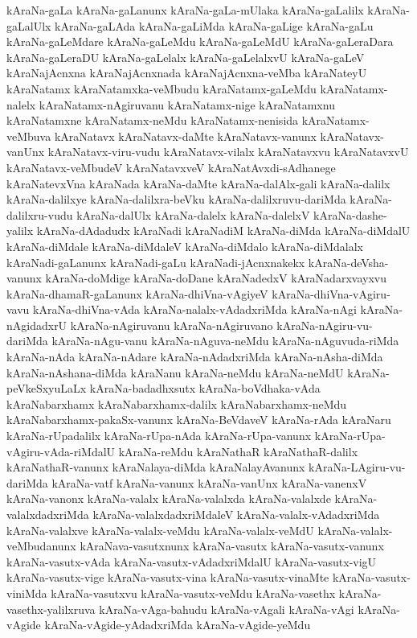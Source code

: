 {kAraNa-gaLa
kAraNa-gaLanunx
kAraNa-gaLa-mUlaka
kAraNa-gaLalilx
kAraNa-gaLalUlx
kAraNa-gaLAda
kAraNa-gaLiMda
kAraNa-gaLige
kAraNa-gaLu
kAraNa-gaLeMdare
kAraNa-gaLeMdu
kAraNa-gaLeMdU
kAraNa-gaLeraDara
kAraNa-gaLeraDU
kAraNa-gaLelalx
kAraNa-gaLelalxvU
kAraNa-gaLeV
kAraNajAcnxna
kAraNajAcnxnada
kAraNajAcnxna-veMba
kAraNateyU
kAraNatamx
kAraNatamxka-veMbudu
kAraNatamx-gaLeMdu
kAraNatamx-nalelx
kAraNatamx-nAgiruvanu
kAraNatamx-nige
kAraNatamxnu
kAraNatamxne
kAraNatamx-neMdu
kAraNatamx-nenisida
kAraNatamx-veMbuva
kAraNatavx
kAraNatavx-daMte
kAraNatavx-vanunx
kAraNatavx-vanUnx
kAraNatavx-viru-vudu
kAraNatavx-vilalx
kAraNatavxvu
kAraNatavxvU
kAraNatavx-veMbudeV
kAraNatavxveV
kAraNatAvxdi-sAdhanege
kAraNatevxVna
kAraNada
kAraNa-daMte
kAraNa-dalAlx-gali
kAraNa-dalilx
kAraNa-dalilxye
kAraNa-dalilxra-beVku
kAraNa-dalilxruvu-dariMda
kAraNa-dalilxru-vudu
kAraNa-dalUlx
kAraNa-dalelx
kAraNa-dalelxV
kAraNa-dashe-yalilx
kAraNa-dAdadudx
kAraNadi
kAraNadiM
kAraNa-diMda
kAraNa-diMdalU
kAraNa-diMdale
kAraNa-diMdaleV
kAraNa-diMdalo
kAraNa-diMdalalx
kAraNadi-gaLanunx
kAraNadi-gaLu
kAraNadi-jAcnxnakekx
kAraNa-deVsha-vanunx
kAraNa-doMdige
kAraNa-doDane
kAraNadedxV
kAraNadarxvayxvu
kAraNa-dhamaR-gaLanunx
kAraNa-dhiVna-vAgiyeV
kAraNa-dhiVna-vAgiru-vavu
kAraNa-dhiVna-vAda
kAraNa-nalalx-vAdadxriMda
kAraNa-nAgi
kAraNa-nAgidadxrU
kAraNa-nAgiruvanu
kAraNa-nAgiruvano
kAraNa-nAgiru-vu-dariMda
kAraNa-nAgu-vanu
kAraNa-nAguva-neMdu
kAraNa-nAguvuda-riMda
kAraNa-nAda
kAraNa-nAdare
kAraNa-nAdadxriMda
kAraNa-nAsha-diMda
kAraNa-nAshana-diMda
kAraNanu
kAraNa-neMdu
kAraNa-neMdU
kAraNa-peVkeSxyuLaLx
kAraNa-badadhxsutx
kAraNa-boVdhaka-vAda
kAraNabarxhamx
kAraNabarxhamx-dalilx
kAraNabarxhamx-neMdu
kAraNabarxhamx-pakaSx-vanunx
kAraNa-BeVdaveV
kAraNa-rAda
kAraNaru
kAraNa-rUpadalilx
kAraNa-rUpa-nAda
kAraNa-rUpa-vanunx
kAraNa-rUpa-vAgiru-vAda-riMdalU
kAraNa-reMdu
kAraNathaR
kAraNathaR-dalilx
kAraNathaR-vanunx
kAraNalaya-diMda
kAraNalayAvanunx
kAraNa-LAgiru-vu-dariMda
kAraNa-vatf
kAraNa-vanunx
kAraNa-vanUnx
kAraNa-vanenxV
kAraNa-vanonx
kAraNa-valalx
kAraNa-valalxda
kAraNa-valalxde
kAraNa-valalxdadxriMda
kAraNa-valalxdadxriMdaleV
kAraNa-valalx-vAdadxriMda
kAraNa-valalxve
kAraNa-valalx-veMdu
kAraNa-valalx-veMdU
kAraNa-valalx-veMbudanunx
kAraNava-vasutxnunx
kAraNa-vasutx
kAraNa-vasutx-vanunx
kAraNa-vasutx-vAda
kAraNa-vasutx-vAdadxriMdalU
kAraNa-vasutx-vigU
kAraNa-vasutx-vige
kAraNa-vasutx-vina
kAraNa-vasutx-vinaMte
kAraNa-vasutx-viniMda
kAraNa-vasutxvu
kAraNa-vasutx-veMdu
kAraNa-vasethx
kAraNa-vasethx-yalilxruva
kAraNa-vAga-bahudu
kAraNa-vAgali
kAraNa-vAgi
kAraNa-vAgide
kAraNa-vAgide-yAdadxriMda
kAraNa-vAgide-yeMdu
}
